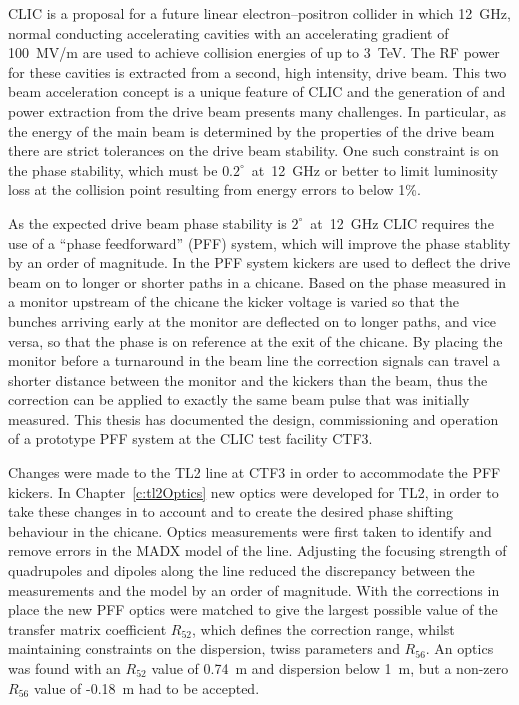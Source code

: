 

CLIC is a proposal for a future linear electron--positron collider in which 12~GHz, normal conducting accelerating cavities with an accelerating gradient of 100~MV/m are used to achieve collision energies of up to 3~TeV. The RF power for these cavities is extracted from a second, high intensity, drive beam. This two beam acceleration concept is a unique feature of CLIC and the generation of and power extraction from the drive beam presents many challenges. In particular, as the energy of the main beam is determined by the properties of the drive beam there are strict tolerances on the drive beam stability. One such constraint is on the phase stability, which must be \(0.2^\circ\)~at~12~GHz or better to limit luminosity loss at the collision point resulting from energy errors to below 1\%. 

As the expected drive beam phase stability is \(2^\circ\)~at~12~GHz CLIC requires the use of a ``phase feedforward'' (PFF) system, which will improve the phase stablity by an order of magnitude. In the PFF system kickers are used to deflect the drive beam on to longer or shorter paths in a chicane. Based on the phase measured in a monitor upstream of the chicane the kicker voltage is varied so that the bunches arriving early at the monitor are deflected on to longer paths, and vice versa, so that the phase is on reference at the exit of the chicane. By placing the monitor before a turnaround in the beam line the correction signals can travel a shorter distance between the monitor and the kickers than the beam, thus the correction can be applied to exactly the same beam pulse that was initially measured. This thesis has documented the design, commissioning and operation of a prototype PFF system at the CLIC test facility CTF3.

Changes were made to the TL2 line at CTF3 in order to accommodate the PFF kickers. In Chapter~\ref{c:tl2Optics} new optics were developed for TL2, in order to take these changes in to account and to create the desired phase shifting behaviour in the chicane. Optics measurements were first taken to identify and remove errors in the MADX model of the line. Adjusting the focusing strength of quadrupoles and dipoles along the line reduced the discrepancy between the measurements and the model by an order of magnitude. With the corrections in place the new PFF optics were matched to give the largest possible value of the transfer matrix coefficient \(R_{52}\), which defines the correction range, whilst maintaining constraints on the dispersion, twiss parameters and \(R_{56}\). An optics was found with an \(R_{52}\) value of 0.74~m and dispersion below 1~m, but a non-zero \(R_{56}\) value of -0.18~m had to be accepted.

